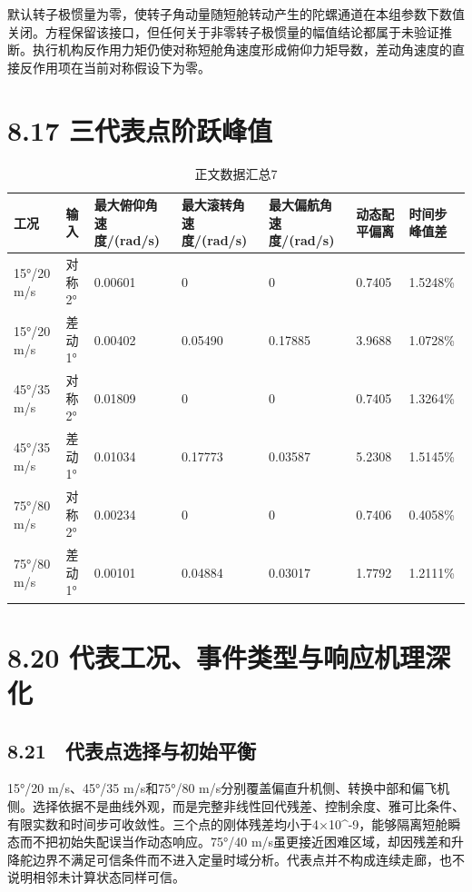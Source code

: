 \documentclass[UTF8,12pt,openany]{ctexbook}
\begin{document}
默认转子极惯量为零，使转子角动量随短舱转动产生的陀螺通道在本组参数下数值关闭。方程保留该接口，但任何关于非零转子极惯量的幅值结论都属于未验证推断。执行机构反作用力矩仍使对称短舱角速度形成俯仰力矩导数，差动角速度的直接反作用项在当前对称假设下为零。


\section{8.17 三代表点阶跃峰值}

\begin{longtable}{p{}p{}p{}p{}p{}p{}p{}}
\caption{正文数据汇总7}\label{tab:auto-7}\\
\toprule
工况 & 输入 & 最大俯仰角速度/(rad/s) & 最大滚转角速度/(rad/s) & 最大偏航角速度/(rad/s) & 动态配平偏离 & 时间步峰值差 \\
\midrule
15°/20 m/s & 对称2° & 0.00601 & 0 & 0 & 0.7405 & 1.5248\% \\
15°/20 m/s & 差动1° & 0.00402 & 0.05490 & 0.17885 & 3.9688 & 1.0728\% \\
45°/35 m/s & 对称2° & 0.01809 & 0 & 0 & 0.7405 & 1.3264\% \\
45°/35 m/s & 差动1° & 0.01034 & 0.17773 & 0.03587 & 5.2308 & 1.5145\% \\
75°/80 m/s & 对称2° & 0.00234 & 0 & 0 & 0.7406 & 0.4058\% \\
75°/80 m/s & 差动1° & 0.00101 & 0.04884 & 0.03017 & 1.7792 & 1.2111\% \\
\bottomrule
\end{longtable}


\section{8.20 代表工况、事件类型与响应机理深化}

\subsection{8.21　代表点选择与初始平衡}

15°/20 m/s、45°/35 m/s和75°/80 m/s分别覆盖偏直升机侧、转换中部和偏飞机侧。选择依据不是曲线外观，而是完整非线性回代残差、控制余度、雅可比条件、有限实数和时间步可收敛性。三个点的刚体残差均小于4×10^-9，能够隔离短舱瞬态而不把初始失配误当作动态响应。75°/40 m/s虽更接近困难区域，却因残差和升降舵边界不满足可信条件而不进入定量时域分析。代表点并不构成连续走廊，也不说明相邻未计算状态同样可信。
\end{document}
